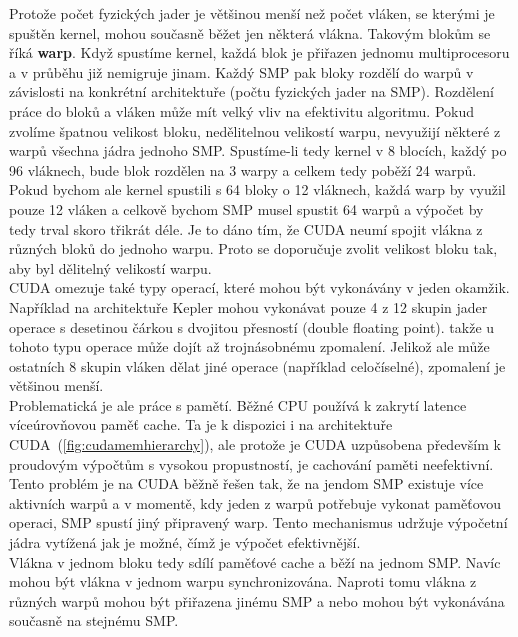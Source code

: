 Protože počet fyzických jader je většinou menší než počet vláken, se kterými je spuštěn kernel, mohou současně běžet jen některá vlákna. Takovým blokům se říká \textbf{warp}. Když spustíme kernel, každá blok je přiřazen jednomu multiprocesoru a v průběhu již nemigruje jinam. Každý SMP pak bloky rozdělí do warpů v závislosti na konkrétní architektuře (počtu fyzických jader na SMP). Rozdělení práce do bloků a vláken může mít velký vliv na efektivitu algoritmu. Pokud zvolíme špatnou velikost bloku, nedělitelnou velikostí warpu, nevyužijí některé z warpů všechna jádra jednoho SMP. Spustíme-li tedy kernel v 8 blocích, každý po 96 vláknech, bude blok rozdělen na 3 warpy a celkem tedy poběží 24 warpů. Pokud bychom ale kernel spustili s 64 bloky o 12 vláknech, každá warp by využil pouze 12 vláken a celkově bychom SMP musel spustit 64 warpů a výpočet by tedy trval skoro třikrát déle. Je to dáno tím, že CUDA neumí spojit vlákna z různých bloků do jednoho warpu. Proto se doporučuje zvolit velikost bloku tak, aby byl dělitelný velikostí warpu.\\

CUDA omezuje také typy operací, které mohou být vykonávány v jeden okamžik. Například na architektuře Kepler mohou vykonávat pouze 4 z 12 skupin jader operace s desetinou čárkou s dvojitou přesností (double floating point). takže u tohoto typu operace může dojít až trojnásobnému zpomalení. Jelikož ale může ostatních 8 skupin vláken dělat jiné operace (například celočíselné), zpomalení je většinou menší.\\

Problematická je ale práce s pamětí. Běžné CPU používá k zakrytí latence víceúrovňovou paměť cache. Ta je k dispozici i na architektuře CUDA~(\autoref{fig:cudamemhierarchy}), ale protože je CUDA uzpůsobena především k proudovým výpočtům s vysokou propustností, je cachování paměti neefektivní. Tento problém je na CUDA běžně řešen tak, že na jendom SMP existuje více aktivních warpů a v momentě, kdy jeden z warpů potřebuje vykonat paměťovou operaci, SMP spustí jiný připravený warp. Tento mechanismus udržuje výpočetní jádra vytížená jak je možné, čímž je výpočet efektivnější.\\
 
Vlákna v jednom bloku tedy sdílí paměťové cache a běží na jednom SMP. Navíc mohou být vlákna v jednom warpu synchronizována. Naproti tomu vlákna z různých warpů mohou být přiřazena jinému SMP a nebo mohou být vykonávána současně na stejnému SMP.\\

